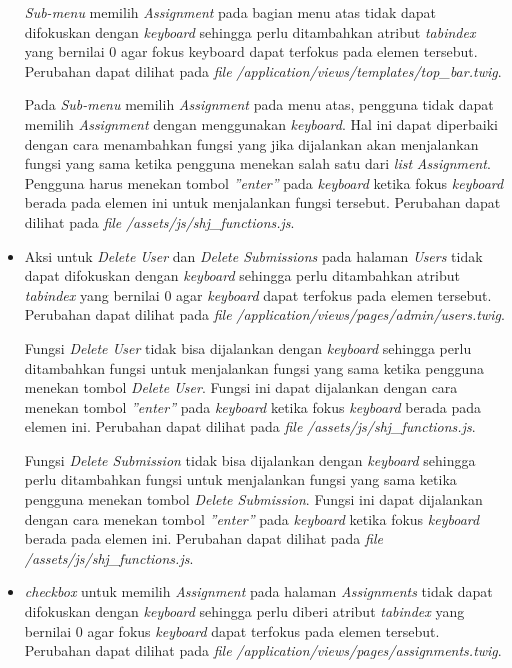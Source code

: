 \begin{itemize}
	\textit{Sub-menu} memilih \textit{Assignment} pada bagian menu atas tidak dapat difokuskan dengan \textit{keyboard} sehingga perlu ditambahkan atribut \textit{tabindex} yang bernilai 0 agar fokus keyboard dapat terfokus pada elemen tersebut. Perubahan dapat dilihat pada \textit{file} \textit{/application/views/templates/top\_bar.twig}.

	Pada \textit{Sub-menu} memilih \textit{Assignment} pada menu atas, pengguna tidak dapat memilih \textit{Assignment} dengan menggunakan \textit{keyboard}. Hal ini dapat diperbaiki dengan cara menambahkan fungsi yang jika dijalankan akan menjalankan fungsi yang sama ketika pengguna menekan salah satu dari \textit{list} \textit{Assignment}. Pengguna harus menekan tombol \textit{''enter''} pada \textit{keyboard} ketika fokus \textit{keyboard} berada pada elemen ini untuk menjalankan fungsi tersebut. Perubahan dapat dilihat pada \textit{file} \textit{/assets/js/shj\_functions.js}.
	
	\item Aksi untuk \textit{Delete User} dan \textit{Delete Submissions} pada halaman \textit{Users} tidak dapat difokuskan dengan \textit{keyboard} sehingga perlu ditambahkan atribut \textit{tabindex} yang bernilai 0 agar \textit{keyboard} dapat terfokus pada elemen tersebut. Perubahan dapat dilihat pada \textit{file} \textit{/application/views/pages/admin/users.twig}.

	Fungsi \textit{Delete User} tidak bisa dijalankan dengan \textit{keyboard} sehingga perlu ditambahkan fungsi untuk menjalankan fungsi yang sama ketika pengguna menekan tombol \textit{Delete User}. Fungsi ini dapat dijalankan dengan cara menekan tombol \textit{''enter''} pada \textit{keyboard} ketika fokus \textit{keyboard} berada pada elemen ini. Perubahan dapat dilihat pada \textit{file} \textit{/assets/js/shj\_functions.js}.

	Fungsi \textit{Delete Submission} tidak bisa dijalankan dengan \textit{keyboard} sehingga perlu ditambahkan fungsi untuk menjalankan fungsi yang sama ketika pengguna menekan tombol \textit{Delete Submission}. Fungsi ini dapat dijalankan dengan cara menekan tombol \textit{''enter''} pada \textit{keyboard} ketika fokus \textit{keyboard} berada pada elemen ini. Perubahan dapat dilihat pada \textit{file} \textit{/assets/js/shj\_functions.js}.

	\item \textit{checkbox} untuk memilih \textit{Assignment} pada halaman \textit{Assignments} tidak dapat difokuskan dengan \textit{keyboard} sehingga perlu diberi atribut \textit{tabindex} yang bernilai 0 agar fokus \textit{keyboard} dapat terfokus pada elemen tersebut. Perubahan dapat dilihat pada \textit{file} \textit{/application/views/pages/assignments.twig}.


\end{itemize}
